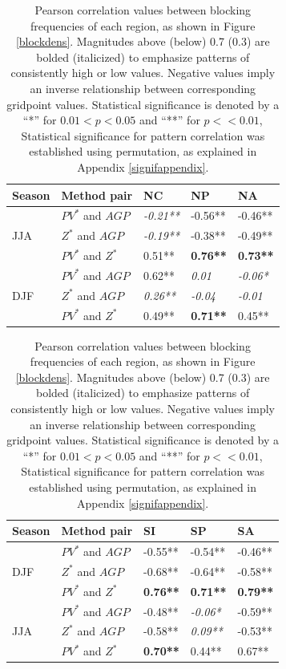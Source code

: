 \documentclass[smallextended]{svjour3}       %
\numberwithin{equation}{section}
\begin{document}
\begin{table}
\centering
\caption{Pearson correlation values between blocking frequencies of each region, as shown in Figure \ref{blockdens}.{\color{blue} Magnitudes above (below) 0.7 (0.3) are bolded (italicized) to emphasize patterns of consistently high or low values. Negative values imply an inverse relationship between corresponding gridpoint values. Statistical significance is denoted by a ``*'' for $0.01<p<0.05$ and ``**'' for $p<<0.01$, Statistical significance for pattern correlation was established using permutation, as explained in Appendix \ref{signifappendix}. }}
\label{pearsontabcol}
\begin{tabular}{|l|l|l|l|l|}
\hline
 Season & Method pair & NC    & NP    & NA   \\ \hline
\multirow{3}{*}{JJA} 
   & $PV^* $ and $AGP$  & \textit{-0.21**} & -0.56** & -0.46** \\ 
   & $Z^*$ and $AGP$  & \textit{-0.19**} & -0.38** & -0.49** \\  
   & $PV^*$ and $Z^*$  & 0.51** & \textbf{0.76**} & \textbf{0.73**} \\ 
   \hline
\multirow{3}{*}{DJF}
  & $PV^*$ and $AGP$ & 0.62** & \textit{0.01} &\textit{ -0.06*} \\  
  & $Z^*$ and $AGP$  & \textit{0.26**}& \textit{-0.04}& \textit{-0.01}  \\ 
  & $PV^*$ and $Z^*$  & 0.49** & \textbf{0.71**} & 0.45**  \\   \hline
\end{tabular}
\begin{tabular}{|l|l|l|l|l|}
\hline
 Season & Method pair &  SI    & SP    & SA    \\ \hline

\multirow{3}{*}{DJF}
  & $PV^*$ and $AGP$  & -0.55**&-0.54** & -0.46**\\  
  & $Z^*$ and $AGP$   & -0.68**& -0.64** & -0.58**\\ 
  & $PV^*$ and $Z^*$  & \textbf{0.76**} & \textbf{0.71**} & \textbf{0.79**} \\   \hline
  
  \multirow{3}{*}{JJA} 
   & $PV^* $ and $AGP$  & -0.48** & \textit{-0.06*} & -0.59**\\ 
   & $Z^*$ and $AGP$  & -0.58** & \textit{0.09**} & {-0.53**} \\  
   & $PV^*$ and $Z^*$  & \textbf{0.70**} & {0.44**} & {0.67**} \\ 
   \hline
\end{tabular}
\end{table}
\end{document}
